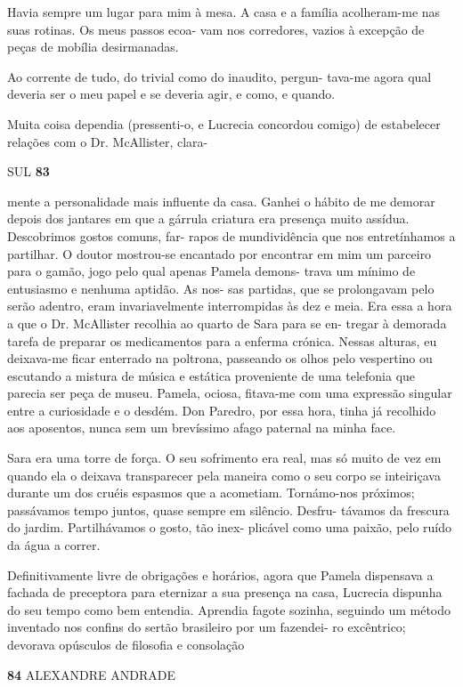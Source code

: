 Havia sempre um lugar para mim à mesa. A casa e a família acolheram-me
nas suas rotinas. Os meus passos ecoa- vam nos corredores, vazios à
excepção de peças de mobília desirmanadas.

Ao corrente de tudo, do trivial como do inaudito, pergun- tava-me agora
qual deveria ser o meu papel e se deveria agir, e como, e quando.

Muita coisa dependia (pressenti-o, e Lucrecia concordou comigo) de
estabelecer relações com o Dr. McAllister, clara-

SUL \textbf{83}

mente a personalidade mais influente da casa. Ganhei o hábito de me
demorar depois dos jantares em que a gárrula criatura era presença muito
assídua. Descobrimos gostos comuns, far- rapos de mundividência que nos
entretínhamos a partilhar. O doutor mostrou-se encantado por encontrar
em mim um parceiro para o gamão, jogo pelo qual apenas Pamela demons-
trava um mínimo de entusiasmo e nenhuma aptidão. As nos- sas partidas,
que se prolongavam pelo serão adentro, eram invariavelmente
interrompidas às dez e meia. Era essa a hora a que o Dr. McAllister
recolhia ao quarto de Sara para se en- tregar à demorada tarefa de
preparar os medicamentos para a enferma crónica. Nessas alturas, eu
deixava-me ficar enterrado na poltrona, passeando os olhos pelo
vespertino ou escutando a mistura de música e estática proveniente de
uma telefonia que parecia ser peça de museu. Pamela, ociosa, fitava-me
com uma expressão singular entre a curiosidade e o desdém. Don Paredro,
por essa hora, tinha já recolhido aos aposentos, nunca sem um brevíssimo
afago paternal na minha face.

Sara era uma torre de força. O seu sofrimento era real, mas só muito de
vez em quando ela o deixava transparecer pela maneira como o seu corpo
se inteiriçava durante um dos cruéis espasmos que a acometiam.
Tornámo-nos próximos; passávamos tempo juntos, quase sempre em silêncio.
Desfru- távamos da frescura do jardim. Partilhávamos o gosto, tão inex-
plicável como uma paixão, pelo ruído da água a correr.

Definitivamente livre de obrigações e horários, agora que Pamela
dispensava a fachada de preceptora para eternizar a sua presença na
casa, Lucrecia dispunha do seu tempo como bem entendia. Aprendia fagote
sozinha, seguindo um método inventado nos confins do sertão brasileiro
por um fazendei- ro excêntrico; devorava opúsculos de filosofia e
consolação

\textbf{84 }ALEXANDRE ANDRADE

